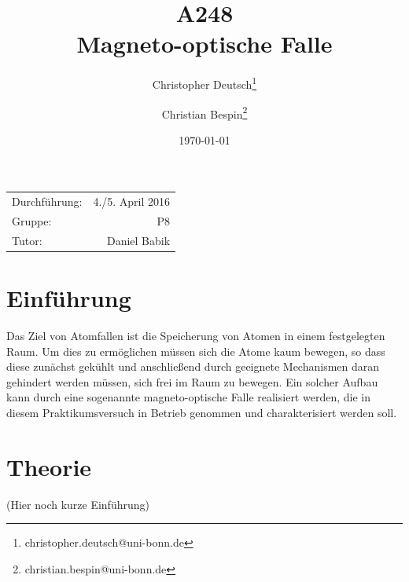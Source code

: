 \documentclass[11pt, a4paper]{article}
\title{A248 \\ Magneto-optische Falle}
\author{Christopher Deutsch\footnote{christopher.deutsch@uni-bonn.de} \and Christian Bespin\footnote{christian.bespin@uni-bonn.de}}
\date{\today}
\numberwithin{equation}{section}
\newcommand{\korr}[1]{{\color{red}(#1)}}
\begin{document}
\begin{titlepage}

\maketitle

\begin{center}
\begin{tabular}{l r}
Durchführung: & 4./5. April 2016 \\
Gruppe: & P8 \\
Tutor: & Daniel Babik
\end{tabular}
\end{center}

\begin{abstract}
\noindent
\end{abstract}

\end{titlepage}

\tableofcontents
\newpage

\section{Einführung}

Das Ziel von Atomfallen ist die Speicherung von Atomen in einem festgelegten Raum.
Um dies zu ermöglichen müssen sich die Atome kaum bewegen, so dass diese zunächst gekühlt und anschließend durch geeignete Mechanismen daran gehindert werden müssen, sich frei im Raum zu bewegen.
Ein solcher Aufbau kann durch eine sogenannte magneto-optische Falle realisiert werden, die in diesem Praktikumsversuch in Betrieb genommen und charakterisiert werden soll.

\section{Theorie}

\korr{Hier noch kurze Einführung}
\end{document}
